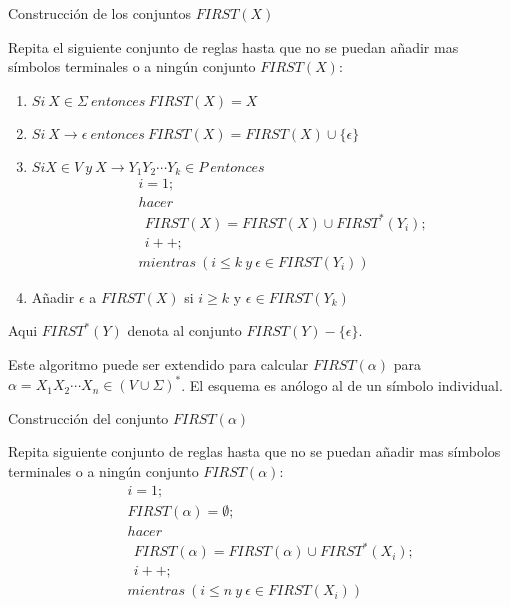 \begin{algorithm} Construcción de los conjuntos $FIRST(X)$

Repita el siguiente conjunto de reglas hasta que no se puedan añadir mas símbolos terminales o  a ningún conjunto $FIRST(X)$:
\begin{enumerate}
\item
$Si\ X \in \Sigma\ entonces\ FIRST(X) = {X}$
\item
$Si\ X \rightarrow \epsilon\ entonces\ FIRST(X) =  FIRST(X) \cup \{ \epsilon \}$
\item
$Si X \in V \ y\ X \rightarrow Y_1 Y_2 \cdots Y_k \in P\ entonces$
\begin{eqnarray}
&&i = 1; \nonumber\\
&&hacer \nonumber\\
&&\ \ FIRST(X) = FIRST(X) \cup FIRST^*(Y_i); \nonumber\\
&&\ \ i++; \nonumber\\
&&mientras\ (i \leq k\ y\ \epsilon \in FIRST(Y_i)) \nonumber 
\end{eqnarray}
\item
Añadir $\epsilon$ a $FIRST(X)$ si $i \geq k$ y $\epsilon \in FIRST(Y_k)$
\end{enumerate}
\end{algorithm}
Aqui $FIRST^*(Y)$ denota al conjunto $FIRST(Y) - \{ \epsilon \}$.

Este algoritmo puede ser extendido para calcular 
$FIRST(\alpha)$ para $\alpha = X_1 X_2 \cdots X_n \in (V \cup \Sigma)^*$.
El esquema es anólogo al de un símbolo individual.

\begin{algorithm} Construcción del conjunto $FIRST(\alpha)$ 

Repita siguiente conjunto de reglas hasta que no se puedan añadir mas
símbolos terminales o  a ningún conjunto $FIRST(\alpha)$:
\begin{eqnarray}
&&i = 1; \nonumber\\
&&FIRST(\alpha) = \emptyset; \nonumber\\
&&hacer \nonumber\\
&&\ \ FIRST(\alpha) = FIRST(\alpha) \cup FIRST^*(X_i); \nonumber\\
&&\ \ i++; \nonumber\\
&&mientras\ (i \leq n\ y\ \epsilon \in FIRST(X_i)) \nonumber 
\end{eqnarray}
\end{algorithm} 

